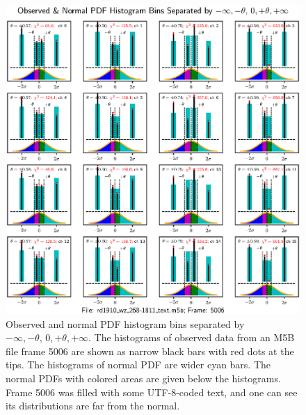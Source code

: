 \documentclass[letterpaper,twoside,12pt]{article}
\begin{document}
\begin{figure}[ht!]
  \begin{center}
  \includegraphics[width=40pc]{fig_4x4_Histograms_text_inserted.eps}
  \caption{\small Observed and normal PDF histogram bins separated by $-\infty, -\theta, \, 0, +\theta, +\infty$. The histograms of observed data from an M5B file frame 5006 are shown as narrow black bars with red dots at the tips. The histograms of normal PDF are wider cyan bars. The normal PDFs with colored areas are given below the histograms. Frame 5006 was filled with some UTF-8-coded text, and one can see its distributions are far from the normal.}
  \label{hists_text_4x4}
  \end{center}
\end{figure}
\end{document}
